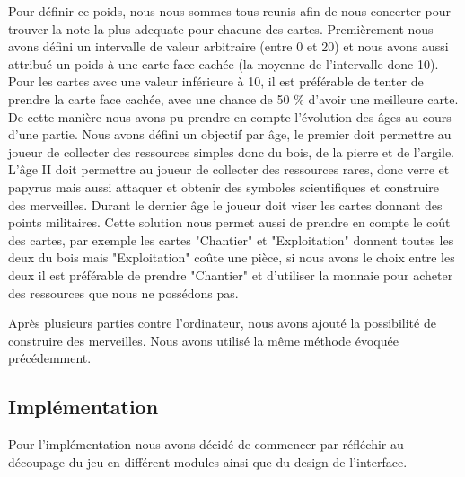 \documentclass[a4paper, 12pt, french]{article}
\begin{document}
	Pour définir ce poids, nous nous sommes tous reunis afin de nous concerter pour trouver la note la plus adequate
	pour chacune des cartes. Premièrement nous avons défini un intervalle de valeur arbitraire (entre 0 et 20)
	et nous avons aussi attribué un poids à une carte face cachée (la moyenne de l'intervalle donc 10).
	Pour les cartes avec une valeur	inférieure à 10, il est préférable de tenter de prendre la carte face cachée,
	avec une chance de 50 \% d'avoir
	une meilleure carte. De cette manière nous avons pu prendre en compte l'évolution des âges au cours d'une partie.
	Nous avons défini un objectif par âge, le premier doit permettre au joueur de collecter des ressources simples
	donc du bois, de la pierre et de l'argile. L'âge II doit permettre au joueur de collecter des ressources rares, donc
	verre et papyrus mais aussi attaquer et obtenir des symboles scientifiques et construire des merveilles. Durant
	le dernier âge le joueur doit viser les cartes donnant des points militaires.
	Cette solution nous permet aussi de prendre
	en compte le coût des cartes, par exemple les cartes "Chantier" et "Exploitation" donnent toutes les deux du bois
	mais "Exploitation" coûte une pièce, si nous avons le choix entre les deux il est préférable de prendre "Chantier"
	et d'utiliser la monnaie pour acheter des ressources que nous ne possédons pas.


	Après plusieurs parties contre l'ordinateur, nous avons ajouté la possibilité de construire des merveilles.
	Nous avons utilisé la même méthode évoquée précédemment.


	\subsection{Implémentation}
	Pour l'implémentation nous avons décidé de commencer par réfléchir au découpage du jeu
	en différent modules ainsi que du design de l'interface.
\end{document}
